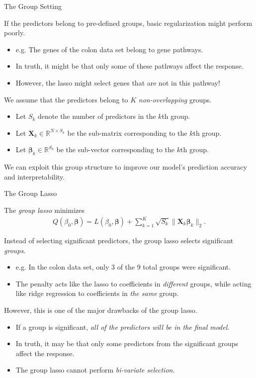 \documentclass[8pt]{beamer}
\newcommand{\mys}{\vspace{0.5cm} %
}
\newcommand{\mysa}{\vspace{0.2cm} %
}
\begin{document}
\begin{frame}{The Group Setting}

If the predictors belong to pre-defined groups, basic regularization might perform poorly.
\begin{itemize}
    \item e.g. The genes of the colon data set belong to gene pathways.
    \item In truth, it might be that only some of these pathways affect the response.
    \item However, the lasso might select genes that are not in this pathway! %
\end{itemize} \mys

We assume that the predictors belong to $K$ \textit{non-overlapping} groups.
\begin{itemize}
    \item Let $S_k$ denote the number of predictors in the $k$th group.
    \item Let $\mathbf{X}_k \in \mathbb{R}^{N \times S_k}$ be the sub-matrix corresponding to the $k$th group.
    \item Let $\bm{\beta}_k \in \mathbb{R}^{S_k}$ be the sub-vector corresponding to the $k$th group.
\end{itemize} \mys

We can exploit this group structure to improve our model's prediction accuracy and interpretability.
    
\end{frame}

\begin{frame}{\color{white} The Group Lasso}

The \textit{group lasso} minimizes 
\begin{align}
    \label{grouplasso}
    Q(\beta_0, \bm{\beta}) = L(\beta_0, \bm{\beta}) + \sum_{k=1}^K \sqrt{S_k} \| \mathbf{X}_k \bm{\beta}_k \|_2.
\end{align} \mysa

Instead of selecting significant predictors, the group lasso selects significant \textit{groups}.
\begin{itemize}
    \item e.g. In the colon data set, only 3 of the 9 total groups were significant.
    \item The penalty acts like the lasso to coefficients in \textit{different} groups, while acting like ridge regression to coefficients in \textit{the same} group.
\end{itemize} \mys

However, this is one of the major drawbacks of the group lasso.
\begin{itemize}
    \item If a group is significant, \textit{all of the predictors will be in the final model}.
    \item In truth, it may be that only some predictors from the significant groups affect the response. %
    \item The group lasso cannot perform \textit{bi-variate selection}.
\end{itemize}
    
\end{frame}
\end{document}

